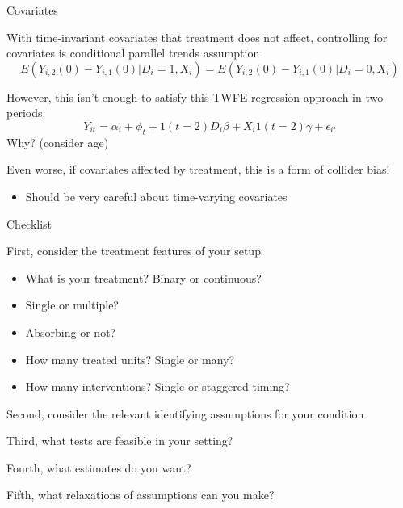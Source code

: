 \documentclass[notes,11pt, aspectratio=169]{beamer}
\newenvironment{wideitemize}{\itemize\addtolength{\itemsep}{10pt}}{\enditemize}
\begin{document}
\begin{frame}{Covariates}
  \begin{wideitemize}
  \item With time-invariant covariates that treatment does not affect,
    controlling for covariates is conditional parallel trends
    assumption
    \begin{equation}
      E(Y_{i,2}(0)-Y_{i,1}(0) | D_{i} = 1, X_{i}) =       E(Y_{i,2}(0)-Y_{i,1}(0) | D_{i} = 0, X_{i})
    \end{equation}
  \item However, this isn't enough to satisfy this TWFE regression approach in two periods:
    \begin{equation}
      Y_{it} = \alpha_{i} + \phi_{t} + 1(t=2)D_{i}\beta + X_{i}1(t = 2)\gamma + \epsilon_{it}
    \end{equation}
    Why? (consider age)
  \item Even worse, if covariates affected by treatment, this is a form of
    collider bias!
    \begin{itemize}
    \item Should be very careful about time-varying covariates
    \end{itemize}
  \end{wideitemize}
\end{frame}


\begin{frame}{Checklist}
  \begin{wideitemize}
  \item First, consider the treatment features of your setup
      \begin{itemize}
    \item What is your treatment? Binary or continuous?
    \item Single or multiple?
    \item Absorbing or not?
    \item How many treated units? Single or many?
    \item How many interventions? Single or staggered timing?
    \end{itemize}
  \item Second, consider the relevant identifying assumptions for your condition
  \item Third, what tests are feasible in your setting?
  \item Fourth, what estimates do you want?
  \item Fifth, what relaxations of assumptions can you make?
  \end{wideitemize}
\end{frame}
\end{document}
